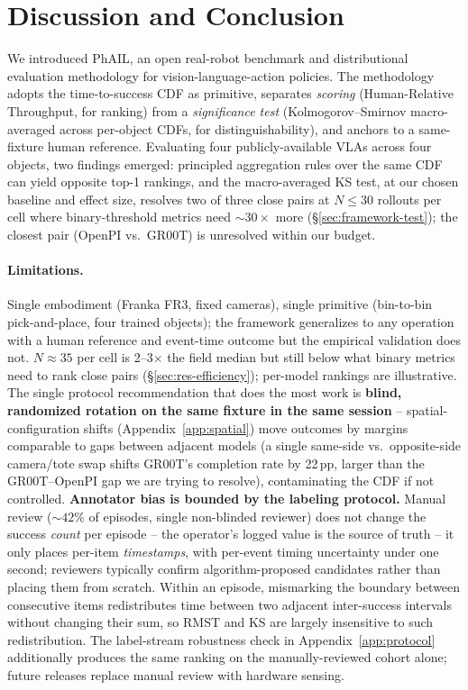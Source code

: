 \documentclass{article}
\begin{document}
\section{Discussion and Conclusion}\label{sec:conclusion}

We introduced PhAIL, an open real-robot benchmark and distributional evaluation methodology for vision-language-action policies. The methodology adopts the time-to-success CDF as primitive, separates \emph{scoring} (Human-Relative Throughput, for ranking) from a \emph{significance test} (Kolmogorov--Smirnov macro-averaged across per-object CDFs, for distinguishability), and anchors to a same-fixture human reference. Evaluating four publicly-available VLAs across four objects, two findings emerged: principled aggregation rules over the same CDF can yield opposite top-1 rankings, and the macro-averaged KS test, at our chosen baseline and effect size, resolves two of three close pairs at $N \le 30$ rollouts per cell where binary-threshold metrics need ${\sim}30\times$ more (\S\ref{sec:framework-test}); the closest pair (OpenPI vs.\ GR00T) is unresolved within our budget.

\paragraph{Limitations.} Single embodiment (Franka FR3, fixed cameras), single primitive (bin-to-bin pick-and-place, four trained objects); the framework generalizes to any operation with a human reference and event-time outcome but the empirical validation does not. $N{\approx}35$ per cell is 2--3$\times$ the field median but still below what binary metrics need to rank close pairs (\S\ref{sec:res-efficiency}); per-model rankings are illustrative. The single protocol recommendation that does the most work is \textbf{blind, randomized rotation on the same fixture in the same session} -- spatial-configuration shifts (Appendix~\ref{app:spatial}) move outcomes by margins comparable to gaps between adjacent models (a single same-side vs.\ opposite-side camera/tote swap shifts GR00T's completion rate by 22\,pp, larger than the GR00T--OpenPI gap we are trying to resolve), contaminating the CDF if not controlled. \textbf{Annotator bias is bounded by the labeling protocol.} Manual review (${\sim}42\%$ of episodes, single non-blinded reviewer) does not change the success \emph{count} per episode -- the operator's logged value is the source of truth -- it only places per-item \emph{timestamps}, with per-event timing uncertainty under one second; reviewers typically confirm algorithm-proposed candidates rather than placing them from scratch. Within an episode, mismarking the boundary between consecutive items redistributes time between two adjacent inter-success intervals without changing their sum, so RMST and KS are largely insensitive to such redistribution. The label-stream robustness check in Appendix~\ref{app:protocol} additionally produces the same ranking on the manually-reviewed cohort alone; future releases replace manual review with hardware sensing.
\end{document}
